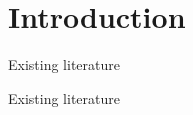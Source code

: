 \documentclass[xcolor=x11names,compress]{beamer}
\begin{document}
\section{Introduction}
{
    \begin{frame}[t]{Existing literature}
        \vspace*{-0.3cm}
        \begin{minipage}[t]{\textwidth}
            
        \end{minipage}
    \end{frame}}

{
    \begin{frame}[t]{Existing literature}
        \vspace*{-0.3cm}
        \begin{minipage}[t]{\textwidth}
            
        \end{minipage}
    \end{frame}}
\end{document}
